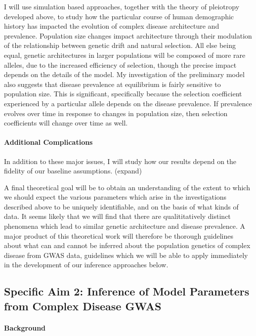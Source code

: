 \documentclass[11pt]{article}
\newcommand{\jb}[1]{{\color{blue} (#1)} }
\begin{document}
I will use simulation based approaches, together with the theory of pleiotropy developed above, to study how the particular course of human demographic history has impacted the evolution of complex disease architecture and prevalence. Population size changes impact architecture through their modulation of the relationship between genetic drift and natural selection. All else being equal, genetic architectures in larger populations will be composed of more rare alleles, due to the increased efficiency of selection, though the precise impact depends on the details of the model. My investigation of the preliminary model also suggests that disease prevalence at equilibrium is fairly sensitive to population size. This is significant, specifically because the selection coefficient experienced by a particular allele depends on the disease prevalence. If prevalence evolves over time in response to changes in population size, then selection coefficients will change over time as well.

\paragraph{Additional Complications}

In addition to these major issues, I will study how our results depend on the fidelity of our baseline assumptions. \jb{expand}

A final theoretical goal will be to obtain an understanding of the extent to which we should expect the various parameters which arise in the investigations described above to be uniquely identifiable, and on the basis of what kinds of data. It seems likely that we will find that there are qualititatively distinct phenomena which lead to similar genetic architecture and disease prevalence. A major product of this theoretical work will therefore be thorough guidelines about what can and cannot be inferred about the population genetics of complex disease from GWAS data, guidelines which we will be able to apply immediately in the development of our inference approaches below. 


\subsection*{Specific Aim 2: Inference of Model Parameters from Complex Disease GWAS}

\paragraph{Background}
\end{document}
